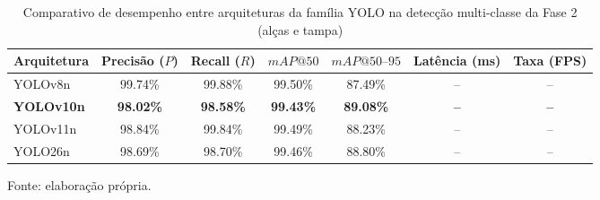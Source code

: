 \begin{table}[H]
    \centering
    \small
    \setlength{\tabcolsep}{5pt}
    \captionsetup{justification=centering}
    \caption{Comparativo de desempenho entre arquiteturas da família YOLO na detecção multi-classe da Fase 2 (alças e tampa)}
    \label{tab:comparativo_yolo_fase2_resultados}
    \vspace{0.2cm}
    \begin{tabular}{lcccccc}
        \hline
        \textbf{Arquitetura} & \textbf{Precisão ($P$)} & \textbf{Recall ($R$)} & \textbf{$mAP@50$} & \textbf{$mAP@50\text{--}95$} & \textbf{Latência (ms)} & \textbf{Taxa (FPS)} \\
        \hline
        YOLOv8n    & 99.74\%      & 99.88\%    & 99.50\%    & 87.49\%         & --           & -- \\
        \textbf{YOLOv10n} & \textbf{98.02\%} & \textbf{98.58\%} & \textbf{99.43\%} & \textbf{89.08\%} & \textbf{--} & \textbf{--} \\
        YOLOv11n   & 98.84\%      & 99.84\%    & 99.49\%    & 88.23\%         & --           & -- \\
        YOLO26n    & 98.69\%      & 98.70\%    & 99.46\%    & 88.80\%         & --           & -- \\
        \hline
    \end{tabular}
    \vspace{0.2cm}
    \begin{flushleft}
        \footnotesize Fonte: elaboração própria.
    \end{flushleft}
\end{table}
